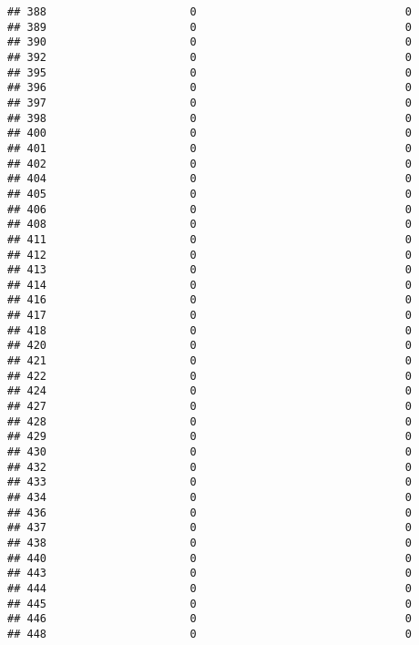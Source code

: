 \documentclass[
]{article}
\begin{document}
\begin{verbatim}
## 388                      0                                0
## 389                      0                                0
## 390                      0                                0
## 392                      0                                0
## 395                      0                                0
## 396                      0                                0
## 397                      0                                0
## 398                      0                                0
## 400                      0                                0
## 401                      0                                0
## 402                      0                                0
## 404                      0                                0
## 405                      0                                0
## 406                      0                                0
## 408                      0                                0
## 411                      0                                0
## 412                      0                                0
## 413                      0                                0
## 414                      0                                0
## 416                      0                                0
## 417                      0                                0
## 418                      0                                0
## 420                      0                                0
## 421                      0                                0
## 422                      0                                0
## 424                      0                                0
## 427                      0                                0
## 428                      0                                0
## 429                      0                                0
## 430                      0                                0
## 432                      0                                0
## 433                      0                                0
## 434                      0                                0
## 436                      0                                0
## 437                      0                                0
## 438                      0                                0
## 440                      0                                0
## 443                      0                                0
## 444                      0                                0
## 445                      0                                0
## 446                      0                                0
## 448                      0                                0

\end{verbatim}
\end{document}
